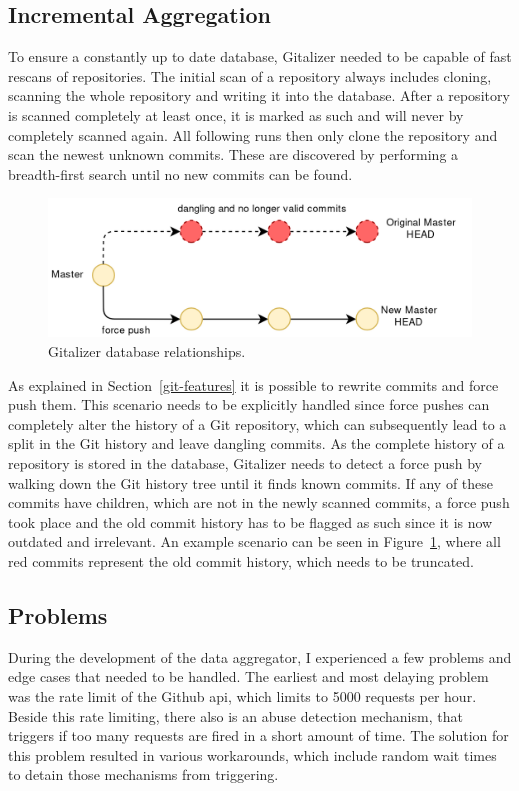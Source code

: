 \subsection{Incremental Aggregation}
To ensure a constantly up to date database, Gitalizer needed to be capable of fast rescans of repositories.
The initial scan of a repository always includes cloning, scanning the whole repository and writing it into the database.
After a repository is scanned completely at least once, it is marked as such and will never by completely scanned again.
All following runs then only clone the repository and scan the newest unknown commits.
These are discovered by performing a breadth-first search until no new commits can be found.

\begin{figure}[H]
\includegraphics[scale=0.3]{./graphs/git-history-rewrite}
\centering
\caption{Gitalizer database relationships.}\label{fig:gitalizer-relationship}
\end{figure}

As explained in Section~\ref{git-features} it is possible to rewrite commits and force push them.
This scenario needs to be explicitly handled since force pushes can completely alter the history of a Git repository, which can subsequently lead to a split in the Git history and leave dangling commits.
As the complete history of a repository is stored in the database, Gitalizer needs to detect a force push by walking down the Git history tree until it finds known commits.
If any of these commits have children, which are not in the newly scanned commits, a force push took place and the old commit history has to be flagged as such since it is now outdated and irrelevant.
An example scenario can be seen in Figure~\ref{fig:gitalizer-relationship}, where all red commits represent the old commit history, which needs to be truncated.


\subsection{Problems}
During the development of the data aggregator, I experienced a few problems and edge cases that needed to be handled.
The earliest and most delaying problem was the rate limit of the Github \ac{api}, which limits to 5000 requests per hour.
Beside this rate limiting, there also is an abuse detection mechanism, that triggers if too many requests are fired in a short amount of time.
The solution for this problem resulted in various workarounds, which include random wait times to detain those mechanisms from triggering.

